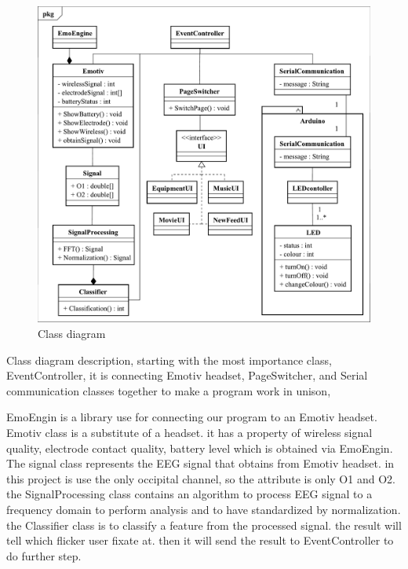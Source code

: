\begin{figure}[ht]
	\centering
	\includegraphics[scale = 0.5]{chapter5/Class.pdf}
	\caption{Class diagram}
\end{figure}

Class diagram description, starting with the most importance class, EventController, it is connecting Emotiv headset, PageSwitcher, and Serial communication classes together to make a program work in unison,

EmoEngin is a library use for connecting our program to an Emotiv headset.  Emotiv class is a substitute of a headset. it has a property of wireless signal quality, electrode contact quality, battery level which is obtained via EmoEngin. The signal class represents the EEG signal that obtains from Emotiv headset. in this project is use the only occipital channel, so the attribute is only O1 and O2. the SignalProcessing class contains an algorithm to process EEG signal to a frequency domain to perform analysis and to have standardized by normalization. the Classifier class is to classify a feature from the processed signal. the result will tell which flicker user fixate at. then it will send the result to EventController to do further step.